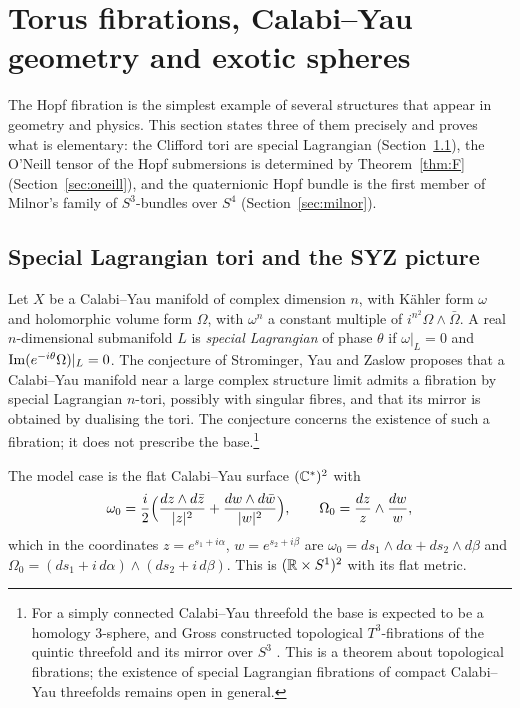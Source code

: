\section{Torus fibrations, Calabi--Yau geometry and exotic spheres}\label{ch:cy}

The Hopf fibration is the simplest example of several structures that appear in geometry and physics. This section states three of them precisely and proves what is elementary: the Clifford tori are special Lagrangian (Section~\ref{sec:syz}), the O'Neill tensor of the Hopf submersions is determined by Theorem~\ref{thm:F} (Section~\ref{sec:oneill}), and the quaternionic Hopf bundle is the first member of Milnor's family of $S^3$-bundles over $S^4$ (Section~\ref{sec:milnor}).

\subsection{Special Lagrangian tori and the SYZ picture}\label{sec:syz}

Let $X$ be a Calabi--Yau manifold of complex dimension $n$, with K\"ahler form $\omega$ and holomorphic volume form $\Omega$, with $\omega^n$ a constant multiple of $i^{n^2}\Omega\wedge\bar\Omega$. A real $n$-dimensional submanifold $L$ is \emph{special Lagrangian} of phase $\theta$ if $\omega|_L=0$ and $\operatorname{Im}(e^{-i\theta}\Omega)|_L=0$. The conjecture of Strominger, Yau and Zaslow \cite{SYZ96} proposes that a Calabi--Yau manifold near a large complex structure limit admits a fibration by special Lagrangian $n$-tori, possibly with singular fibres, and that its mirror is obtained by dualising the tori. The conjecture concerns the existence of such a fibration; it does not prescribe the base.\footnote{For a simply connected Calabi--Yau threefold the base is expected to be a homology $3$-sphere, and Gross constructed topological $T^3$-fibrations of the quintic threefold and its mirror over $S^3$ \cite{Gro01}. This is a theorem about topological fibrations; the existence of special Lagrangian fibrations of compact Calabi--Yau threefolds remains open in general.}

The model case is the flat Calabi--Yau surface $(\mathbb{C}^*)^2$ with
\[
\omega_0=\frac i2\Bigl(\frac{dz\wedge d\bar z}{|z|^2}+\frac{dw\wedge d\bar w}{|w|^2}\Bigr),\qquad \Omega_0=\frac{dz}{z}\wedge\frac{dw}{w},
\]
which in the coordinates $z=e^{s_1+i\alpha}$, $w=e^{s_2+i\beta}$ are $\omega_0=ds_1\wedge d\alpha+ds_2\wedge d\beta$ and $\Omega_0=(ds_1+i\,d\alpha)\wedge(ds_2+i\,d\beta)$. This is $(\mathbb{R}\times S^1)^2$ with its flat metric.

